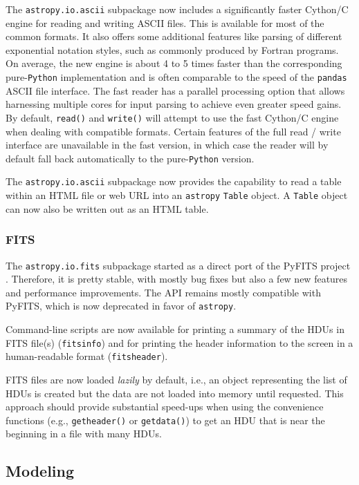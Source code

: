 \documentclass[modern]{aastex62}
\newcommand{\package}[1]{\texttt{#1}\xspace}
\newcommand{\python}{\package{Python}}
\newcommand{\astropypkg}{\package{astropy}}
\begin{document}
The \package{astropy.io.ascii} subpackage now includes a significantly faster
Cython/C engine for reading and writing ASCII files. This is available for most
of the common formats. It also offers some additional features like parsing
of different exponential notation styles, such as commonly produced
by Fortran programs.  On average, the new engine is about 4 to 5 times faster
than the corresponding pure-\python implementation and is often comparable to
the speed of the \package{pandas} \citep{pandas} ASCII file interface.  The
fast reader has a parallel processing option that allows harnessing multiple
cores for input parsing to achieve even greater speed gains.  By default,
\texttt{read()} and \texttt{write()} will attempt to use the fast Cython/C engine
when dealing with compatible formats. Certain features of the full read
/ write interface are unavailable in the fast version, in which case the
reader will by default fall back automatically to the pure-\python version.

The \package{astropy.io.ascii} subpackage now provides the capability
to read a table within an HTML file or web URL into an \astropypkg
\texttt{Table} object. A \texttt{Table} object can now also
be written out as an HTML table.

\subsubsection{FITS}

The \package{astropy.io.fits} subpackage started as a direct port of the
PyFITS project \citep{PyFITS}. Therefore, it is pretty stable, with mostly bug
fixes but also a few new features and performance improvements.  The API
remains mostly compatible with PyFITS, which is now deprecated in favor of
\astropypkg.

Command-line scripts are now available for printing a summary of the HDUs in
FITS file(s) (\texttt{fitsinfo}) and for printing the header information to
the screen in a human-readable format (\texttt{fitsheader}).

FITS files are now loaded \emph{lazily} by default, i.e., an object
representing the list of HDUs is created but the data are not loaded into
memory until requested.  This approach should provide substantial speed-ups
when using the convenience functions (e.g., \texttt{getheader()} or
\texttt{getdata()}) to get an HDU that is near the beginning in a file with
many HDUs.

\subsection{Modeling}
\label{sec:modeling}
\end{document}

